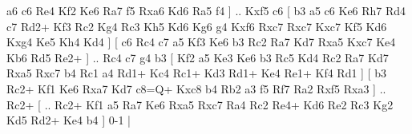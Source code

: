 a6  c6 Re4  Kf2 Ke6  Ra7 f5  Rxa6 Kd6  Ra5 f4   ] .. Kxf5    c6 [  b3 a5  c6 Ke6  Rh7 Rd4  c7 Rd2+  Kf3 Rc2  Kg4 Rc3  Kh5 Kd6  Kg6 g4  Kxf6 Rxc7  Rxc7 Kxc7  Kf5 Kd6  Kxg4 Ke5  Kh4 Kd4   ]  [  c6 Rc4  c7 a5  Kf3 Ke6  b3 Rc2  Ra7 Kd7  Rxa5 Kxc7  Ke4 Kb6  Rd5 Re2+   ] .. Rc4    c7   g4    b3 [  Kf2 a5  Ke3 Ke6  b3 Rc5  Kd4 Rc2  Ra7 Kd7  Rxa5 Rxc7  b4 Rc1  a4 Rd1+  Kc4 Rc1+  Kd3 Rd1+  Ke4 Re1+  Kf4 Rd1   ]  [  b3 Rc2+  Kf1 Ke6  Rxa7 Kd7  c8=Q+ Kxc8  b4 Rb2  a3 f5  Rf7 Ra2  Rxf5 Rxa3   ] .. Rc2+    [ .. Rc2+  Kf1 a5  Ra7 Ke6  Rxa5 Rxc7  Ra4 Rc2  Re4+ Kd6  Re2 Rc3  Kg2 Kd5  Rd2+ Ke4  b4   ] 0-1  |
